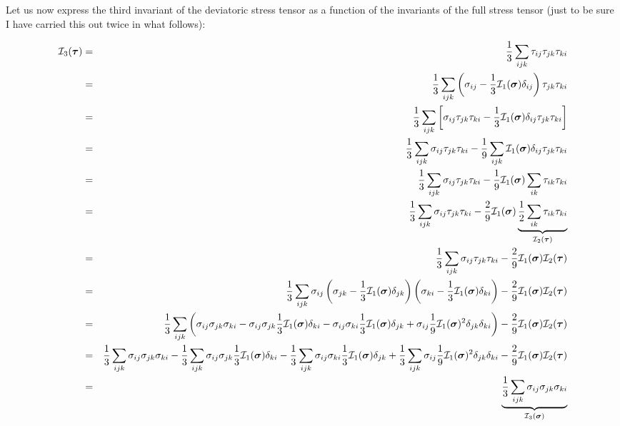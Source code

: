 \newpage
Let us now express the third invariant of the deviatoric stress tensor 
as a function of the invariants of the full stress tensor (just to be sure
I have carried this out twice in what follows): 


\begin{eqnarray}
{\cal I}_3(\bm\tau) 
&=& \frac13 \sum_{ijk} \tau_{ij}\tau_{jk}\tau_{ki} \nn\\
&=& \frac13 \sum_{ijk} 
\left(\sigma_{ij}-\frac13 {\cal I}_1(\bm\sigma) \delta_{ij}\right)
\tau_{jk}\tau_{ki} \nn\\
&=& \frac13 \sum_{ijk} 
\left[ 
\sigma_{ij}
\tau_{jk}\tau_{ki} 
-\frac13 {\cal I}_1(\bm\sigma) \delta_{ij}
\tau_{jk}\tau_{ki} 
\right]
\nn\\
&=& \frac13 
\sum_{ijk} 
\sigma_{ij}
\tau_{jk}\tau_{ki} 
-\frac19
\sum_{ijk} 
 {\cal I}_1(\bm\sigma) \delta_{ij}
\tau_{jk}\tau_{ki}
\nn\\
&=& \frac13 
\sum_{ijk} 
\sigma_{ij}
\tau_{jk}\tau_{ki} 
-\frac19
 {\cal I}_1(\bm\sigma) 
\sum_{ik} 
\tau_{ik}\tau_{ki}  
\nn\\
&=& \frac13 
\sum_{ijk} 
\sigma_{ij}
\tau_{jk}\tau_{ki} 
-\frac29
 {\cal I}_1(\bm\sigma)  
\underbrace{\frac12
\sum_{ik} 
\tau_{ik}\tau_{ki}}_{{\cal I}_2(\bm\tau)}
\nn\\
&=& \frac13 
\sum_{ijk} 
\sigma_{ij}
\tau_{jk}\tau_{ki} 
-\frac29  {\cal I}_1(\bm\sigma)  {\cal I}_2(\bm\tau)
\nn\\
&=& \frac13 
\sum_{ijk} 
\sigma_{ij}
\left(\sigma_{jk}-\frac13 {\cal I}_1(\bm\sigma)  \delta_{jk}\right)
\left(\sigma_{ki}-\frac13 {\cal I}_1(\bm\sigma)  \delta_{ki}\right)
-\frac29  {\cal I}_1(\bm\sigma)    {\cal I}_2(\bm\tau) 
\nn\\
&=& \frac13 
\sum_{ijk} \left( 
\sigma_{ij} \sigma_{jk} \sigma_{ki}
-\sigma_{ij}\sigma_{jk}\frac13 {\cal I}_1(\bm\sigma)  \delta_{ki}
-\sigma_{ij}\sigma_{ki}\frac13 {\cal I}_1(\bm\sigma)  \delta_{jk}
+ \sigma_{ij} \frac19 {\cal I}_1(\bm\sigma) ^2 \delta_{jk} \delta_{ki}
\right)
-\frac29  {\cal I}_1(\bm\sigma)     {\cal I}_2(\bm\tau)
\nn\\
&=& 
\frac13 \sum_{ijk} \sigma_{ij} \sigma_{jk} \sigma_{ki} 
-\frac13 \sum_{ijk} \sigma_{ij}\sigma_{jk}\frac13 {\cal I}_1(\bm\sigma)  \delta_{ki}
-\frac13 \sum_{ijk} \sigma_{ij}\sigma_{ki}\frac13 {\cal I}_1(\bm\sigma)  \delta_{jk}
+\frac13 \sum_{ijk}  \sigma_{ij} \frac19 {\cal I}_1(\bm\sigma) ^2 \delta_{jk} \delta_{ki}
-\frac29  {\cal I}_1(\bm\sigma)      {\cal I}_2(\bm\tau)
\nn\\
&=& 
\underbrace{\frac13 \sum_{ijk} \sigma_{ij} \sigma_{jk} \sigma_{ki}}_{{\cal I}_3(\bm\sigma)}

\end{eqnarray}
